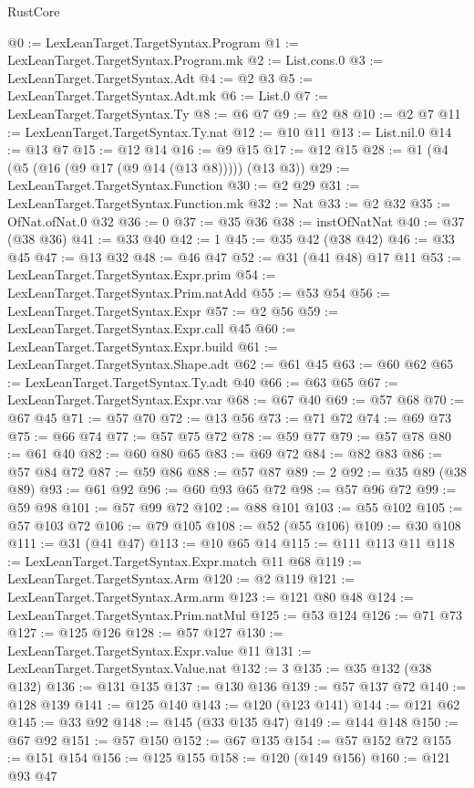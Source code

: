 \begin{lexlean}{RustCore}
\begin{coremodule}
@0 := LexLeanTarget.TargetSyntax.Program
@1 := LexLeanTarget.TargetSyntax.Program.mk
@2 := List.cons.{0}
@3 := LexLeanTarget.TargetSyntax.Adt
@4 := @2 @3
@5 := LexLeanTarget.TargetSyntax.Adt.mk
@6 := List.{0}
@7 := LexLeanTarget.TargetSyntax.Ty
@8 := @6 @7
@9 := @2 @8
@10 := @2 @7
@11 := LexLeanTarget.TargetSyntax.Ty.nat
@12 := @10 @11
@13 := List.nil.{0}
@14 := @13 @7
@15 := @12 @14
@16 := @9 @15
@17 := @12 @15
@28 := @1 (@4 (@5 (@16 (@9 @17 (@9 @14 (@13 @8))))) (@13 @3))
@29 := LexLeanTarget.TargetSyntax.Function
@30 := @2 @29
@31 := LexLeanTarget.TargetSyntax.Function.mk
@32 := Nat
@33 := @2 @32
@35 := OfNat.ofNat.{0} @32
@36 := 0
@37 := @35 @36
@38 := instOfNatNat
@40 := @37 (@38 @36)
@41 := @33 @40
@42 := 1
@45 := @35 @42 (@38 @42)
@46 := @33 @45
@47 := @13 @32
@48 := @46 @47
@52 := @31 (@41 @48) @17 @11
@53 := LexLeanTarget.TargetSyntax.Expr.prim
@54 := LexLeanTarget.TargetSyntax.Prim.natAdd
@55 := @53 @54
@56 := LexLeanTarget.TargetSyntax.Expr
@57 := @2 @56
@59 := LexLeanTarget.TargetSyntax.Expr.call @45
@60 := LexLeanTarget.TargetSyntax.Expr.build
@61 := LexLeanTarget.TargetSyntax.Shape.adt
@62 := @61 @45
@63 := @60 @62
@65 := LexLeanTarget.TargetSyntax.Ty.adt @40
@66 := @63 @65
@67 := LexLeanTarget.TargetSyntax.Expr.var
@68 := @67 @40
@69 := @57 @68
@70 := @67 @45
@71 := @57 @70
@72 := @13 @56
@73 := @71 @72
@74 := @69 @73
@75 := @66 @74
@77 := @57 @75 @72
@78 := @59 @77
@79 := @57 @78
@80 := @61 @40
@82 := @60 @80 @65
@83 := @69 @72
@84 := @82 @83
@86 := @57 @84 @72
@87 := @59 @86
@88 := @57 @87
@89 := 2
@92 := @35 @89 (@38 @89)
@93 := @61 @92
@96 := @60 @93 @65 @72
@98 := @57 @96 @72
@99 := @59 @98
@101 := @57 @99 @72
@102 := @88 @101
@103 := @55 @102
@105 := @57 @103 @72
@106 := @79 @105
@108 := @52 (@55 @106)
@109 := @30 @108
@111 := @31 (@41 @47)
@113 := @10 @65 @14
@115 := @111 @113 @11
@118 := LexLeanTarget.TargetSyntax.Expr.match @11 @68
@119 := LexLeanTarget.TargetSyntax.Arm
@120 := @2 @119
@121 := LexLeanTarget.TargetSyntax.Arm.arm
@123 := @121 @80 @48
@124 := LexLeanTarget.TargetSyntax.Prim.natMul
@125 := @53 @124
@126 := @71 @73
@127 := @125 @126
@128 := @57 @127
@130 := LexLeanTarget.TargetSyntax.Expr.value @11
@131 := LexLeanTarget.TargetSyntax.Value.nat
@132 := 3
@135 := @35 @132 (@38 @132)
@136 := @131 @135
@137 := @130 @136
@139 := @57 @137 @72
@140 := @128 @139
@141 := @125 @140
@143 := @120 (@123 @141)
@144 := @121 @62
@145 := @33 @92
@148 := @145 (@33 @135 @47)
@149 := @144 @148
@150 := @67 @92
@151 := @57 @150
@152 := @67 @135
@154 := @57 @152 @72
@155 := @151 @154
@156 := @125 @155
@158 := @120 (@149 @156)
@160 := @121 @93 @47

\end{coremodule}
\end{lexlean}
